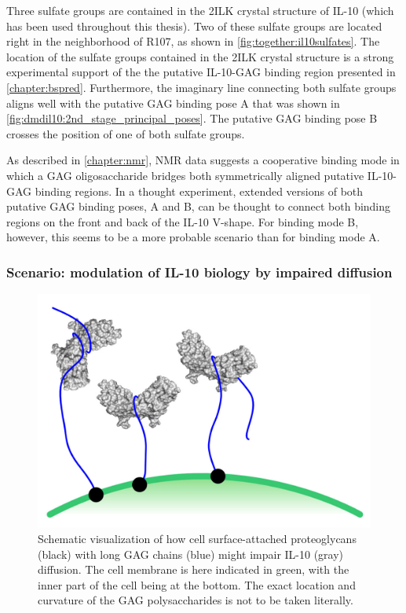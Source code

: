 Three sulfate groups are contained in the 2ILK crystal structure of IL-10 (which
has been used throughout this thesis). Two of these sulfate groups are located
right in the neighborhood of R107, as shown in \cref{fig:together:il10sulfates}.
The location of the sulfate groups contained in the 2ILK crystal structure is a
strong experimental support of the the putative IL-10-GAG binding region
presented in \cref{chapter:bspred}. Furthermore, the imaginary line connecting
both sulfate groups aligns well with the putative GAG binding pose A that was
shown in \cref{fig:dmdil10:2nd_stage_principal_poses}. The putative GAG binding
pose B crosses the position of one of both sulfate groups.

As described in \cref{chapter:nmr}, NMR data suggests a cooperative binding mode
in which a GAG oligosaccharide bridges both symmetrically aligned putative
IL-10-GAG binding regions. In a thought experiment, extended versions of both
putative GAG binding poses, A and B, can be thought to connect both binding
regions on the front and back of the IL-10 V-shape. For binding mode B, however,
this seems to be a more probable scenario than for binding mode A.


\subsubsection{Scenario: modulation of IL-10 biology by impaired diffusion}

\begin{figure}
\centering
\includegraphics[width=1.0\textwidth]{gfx/together/agglomeration_small.jpg}
\caption[]{
Schematic visualization of how cell surface-attached proteoglycans (black) with
long GAG chains (blue) might impair IL-10 (gray) diffusion. The cell membrane is
here indicated in green, with the inner part of the cell being at the bottom.
The exact location and curvature of the GAG polysaccharides is not to be taken
literally.}
\label{fig:together:diffusionimpaired}
\end{figure}

